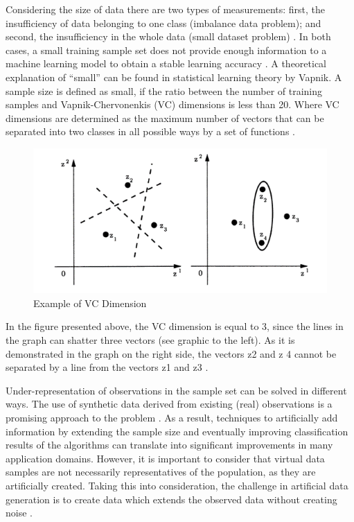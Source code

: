 \documentclass[parskip=full]{scrartcl}
\begin{document}
Considering the size of data there are two types of measurements: first, the 
insufficiency of data belonging to one class (imbalance data problem); and 
second, the insufficiency in the whole data (small dataset problem) 
\cite{Sezer.2014}. In both cases, a small training sample set does not provide 
enough information to a machine learning model to obtain a stable learning 
accuracy \cite{Tsai.2008}. A theoretical explanation of “small” can be found in 
statistical learning theory by Vapnik. A sample size is defined as small, if 
the ratio between the number of training samples and Vapnik-Chervonenkis (VC) 
dimensions is less than 20. Where VC dimensions are determined as the maximum 
number of vectors that can be separated into two classes in all possible ways 
by a set of functions \cite{Vapnik.2008}. 

\begin{figure}[H]
	\centering
	\includegraphics[width=0.6\linewidth]{./resources/vc_dimension}
	\caption{Example of VC Dimension \cite{Vapnik.2008}}
	\label{fig:vc-dimension}
\end{figure}

In the figure presented above, the VC dimension is equal to 3, since the lines
in the graph can shatter three vectors (see graphic to the left). As it is
demonstrated in the graph on the right side, the vectors z{\tiny 2} and z{\tiny
4} cannot be separated by a line from the vectors z{\tiny 1} and z{\tiny 3}
\cite{Vapnik.2008}.

Under-representation of observations in the sample set can be solved in 
different ways. The use of synthetic data derived from existing (real) 
observations is a promising approach to the problem \cite{Sezer.2014}. As a 
result, techniques to artificially add information by extending the sample size 
and eventually improving classification results of the algorithms can translate 
into significant improvements in many application domains. However, it is 
important to consider that virtual data samples are not necessarily 
representatives of the population, as they are artificially created. Taking 
this into consideration, the challenge in artificial data generation is to 
create data which extends the observed data without creating noise 
\cite{Li.2006}. 
\end{document}
